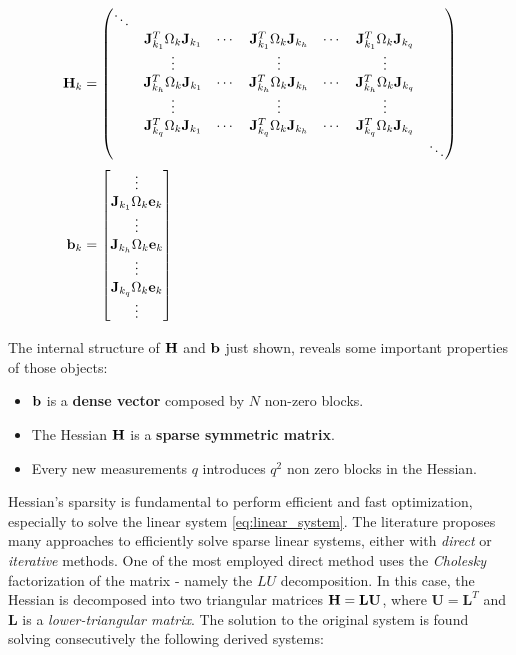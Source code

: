 \begin{align}
    \label{eq:sparse_hessian_structure}
    \mathbf{H}_k &= 
        \begin{pmatrix}
            \ddots &  &  &  &  &  &\\
             & \mathbf{J}_{k_1}^T\Omega_k\mathbf{J}_{k_1} & \cdots & \mathbf{J}_{k_1}^T\Omega_k\mathbf{J}_{k_h} & \cdots & \mathbf{J}_{k_1}^T\Omega_k\mathbf{J}_{k_q} & \\
             & \vdots & & \vdots & & \vdots & \\
             & \mathbf{J}_{k_h}^T\Omega_k\mathbf{J}_{k_1} & \cdots & \mathbf{J}_{k_h}^T\Omega_k\mathbf{J}_{k_h} & \cdots & \mathbf{J}_{k_h}^T\Omega_k\mathbf{J}_{k_q} & \\
             & \vdots & & \vdots & & \vdots & \\
             & \mathbf{J}_{k_q}^T\Omega_k\mathbf{J}_{k_1} & \cdots & \mathbf{J}_{k_q}^T\Omega_k\mathbf{J}_{k_h} & \cdots & \mathbf{J}_{k_q}^T\Omega_k\mathbf{J}_{k_q} & \\
             &  &  &  &  &  & \ddots \\
        \end{pmatrix} \\
    \mathbf{b}_k &= 
        \begin{bmatrix}
            \vdots \\
            \mathbf{J}_{k_1}\Omega_k\mathbf{e}_k \\
            \vdots \\
            \mathbf{J}_{k_h}\Omega_k\mathbf{e}_k \\
            \vdots \\
            \mathbf{J}_{k_q}\Omega_k\mathbf{e}_k \\
            \vdots
        \end{bmatrix}
    \label{eq:rhs_structure}
\end{align}

The internal structure of $\mathbf{H}$ and $\mathbf{b}$ just shown, reveals some important properties of those objects:

\begin{itemize}
    \item $\mathbf{b}$ is a \textbf{dense vector} composed by $N$ non-zero blocks. 
    \item The Hessian $\mathbf{H}$ is a \textbf{sparse symmetric matrix}.
    \item Every new measurements $q$ introduces $q^2$ non zero blocks in the Hessian.
\end{itemize}

Hessian's sparsity is fundamental to perform efficient and fast optimization, especially to solve the linear system \ref{eq:linear_system}. The literature proposes many approaches to efficiently solve sparse linear systems, either with \textit{direct} \cite{davis2006directSPsolvers} or \textit{iterative} \cite{saad2003iterativeSPsolvers} methods. One of the most employed direct method uses the \textit{Cholesky} factorization of the matrix - namely the $LU$ decomposition. In this case, the Hessian is decomposed into two triangular matrices $\mathbf{H} = \mathbf{L}\mathbf{U}$, where $\mathbf{U} = \mathbf{L}^T$ and $\mathbf{L}$ is a \textit{lower-triangular matrix}. The solution to the original system is found solving consecutively the following derived systems:

